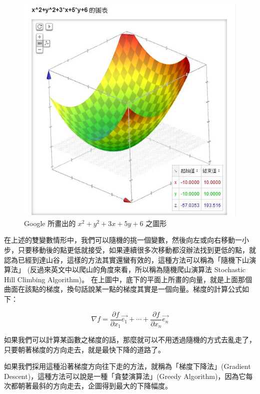 \begin{figure}
  \includegraphics[width=\linewidth]{img/GoogleGraph3D.jpg}
  \caption{Google 所畫出的 $x^2+y^2+3x+5y+6$  之圖形}
  \label{fig:curve3}
\end{figure}



在上述的雙變數情形中，我們可以隨機的挑一個變數，然後向左或向右移動一小步，只要移動後的點更低就接受，如果連續很多次移動都沒辦法找到更低的點，就認為已經到達山谷，這樣的方法其實還蠻有效的，這種方法可以稱為「隨機下山演算法」 (反過來英文中以爬山的角度來看，所以稱為隨機爬山演算法 Stochastic Hill Climbing Algorithm)。
在上圖中，底下的平面上所畫的向量，就是上面那個曲面在該點的梯度，換句話說某一點的梯度其實是一個向量。梯度的計算公式如下：


\begin{equation}
\nabla f  = \frac{\partial f}{\partial x_1 }\vec{e_1} + \cdots + \frac{\partial f}{\partial x_n }\vec{e_n}
\end{equation}


如果我們可以計算某函數之梯度的話，那麼就可以不用透過隨機的方式去亂走了，只要朝著梯度的方向走去，就是最快下降的道路了。

如果我們採用這種沿著梯度方向往下走的方法，就稱為「梯度下降法」(Gradient Descent)，這種方法可以說是一種「貪婪演算法」(Greedy Algorithm)，因為它每次都朝著最斜的方向走去，企圖得到最大的下降幅度。

